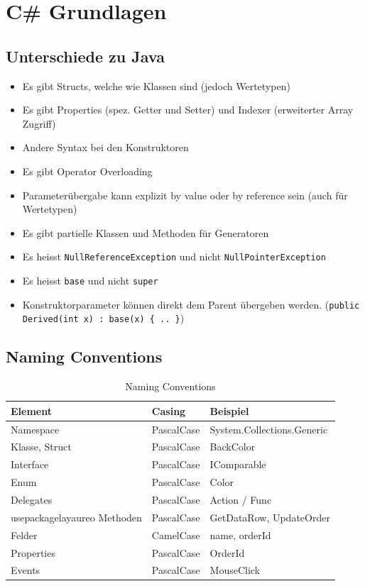 \documentclass[
a4paper,
oneside,
10pt,
fleqn,
headsepline,
toc=listofnumbered, 
bibliography=totocnumbered]{scrartcl}
\let\stdsection\section
\renewcommand\section{\clearpage\stdsection}
\begin{document}
\section{C\# Grundlagen}
\subsection{Unterschiede zu Java}
\begin{itemize}
	\item Es gibt Structs, welche wie Klassen sind (jedoch Wertetypen)
	\item Es gibt Properties (spez. Getter und Setter) und Indexer (erweiterter Array Zugriff)
	\item Andere Syntax bei den Konstruktoren
	\item Es gibt Operator Overloading
	\item Parameterübergabe kann explizit by value oder by reference sein (auch für Wertetypen)
	\item Es gibt partielle Klassen und Methoden für Generatoren
	\item Es heisst \lstinline|NullReferenceException| und nicht \lstinline|NullPointerException|
	\item Es heisst \lstinline|base| und nicht \lstinline|super|
	\item Konstruktorparameter können direkt dem Parent übergeben werden. (\lstinline|public Derived(int x) : base(x) { .. }|)
\end{itemize}

\subsection{Naming Conventions}
\begin{table}[h]
	\centering
	\begin{tabu} to \linewidth {l l l}
		\toprule 
		Element & Casing  & Beispiel \\
		\midrule
		Namespace & PascalCase & System.Collections.Generic \\
		Klasse, Struct & PascalCase & BackColor \\
		Interface & PascalCase & IComparable\\
		Enum & PascalCase & Color\\
		Delegates & PascalCase & Action / Func\\usepackage{layaureo}
		Methoden & PascalCase & GetDataRow, UpdateOrder\\
		Felder & CamelCase & name, orderId \\
		Properties & PascalCase & OrderId \\
		Events & PascalCase & MouseClick \\
		\bottomrule
	\end{tabu} 
	\caption{Naming Conventions}
\end{table}
\end{document}
